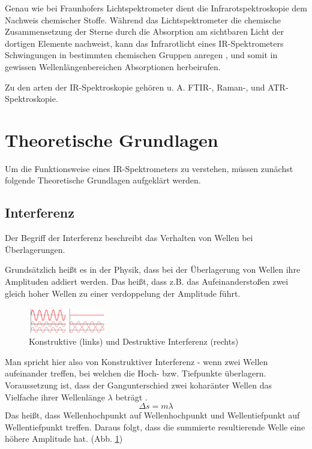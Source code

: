 \documentclass{article}
\begin{document}
Genau wie bei Fraunhofers Lichtspektrometer dient die Infrarotspektroskopie dem Nachweis chemischer Stoffe. Während das Lichtspektrometer die chemische Zusammensetzung der Sterne durch die Absorption am sichtbaren Licht der dortigen Elemente nachweist, kann das Infrarotlicht eines IR-Spektrometers Schwingungen in bestimmten chemischen Gruppen anregen \cite{TODO}, und somit in gewissen Wellenlängenbereichen Absorptionen herbeirufen.

Zu den arten der IR-Spektroskopie gehören u. A. FTIR-, Raman-, und ATR-Spektroskopie.

\newpage
\section{Theoretische Grundlagen}

Um die Funktionsweise eines IR-Spektrometers zu verstehen, müssen zunächst folgende Theoretische Grundlagen aufgeklärt werden.

\subsection{Interferenz}

Der Begriff der Interferenz beschreibt das Verhalten von Wellen bei Überlagerungen.

Grundsätzlich heißt es in der Physik, dass bei der Überlagerung von Wellen ihre Amplituden addiert werden. Das heißt, dass z.B. das Aufeinanderstoßen zwei gleich hoher Wellen zu einer verdoppelung der Amplitude führt.

\begin{figure}
    \centering
    \includegraphics[width=0.3\textwidth]{interferenz.png}
    \caption{Konstruktive (links) und Destruktive Interferenz (rechts) \cite{TODO}}
    \label{fig:interferenz}
\end{figure}
Man spricht hier also von Konstruktiver Interferenz - wenn zwei Wellen aufeinander treffen, bei welchen die Hoch- bzw. Tiefpunkte überlagern. Voraussetzung ist, dass der Gangunterschied zwei koharänter Wellen das Vielfache ihrer Wellenlänge $\lambda$ beträgt \cite{TODO}.
\begin{equation}
    \Delta s = m \lambda
\end{equation}
Das heißt, dass Wellenhochpunkt auf Wellenhochpunkt und Wellentiefpunkt auf Wellentiefpunkt treffen. Daraus folgt, dass die summierte resultierende Welle eine höhere Amplitude hat. (Abb. \ref{fig:interferenz})
\end{document}
